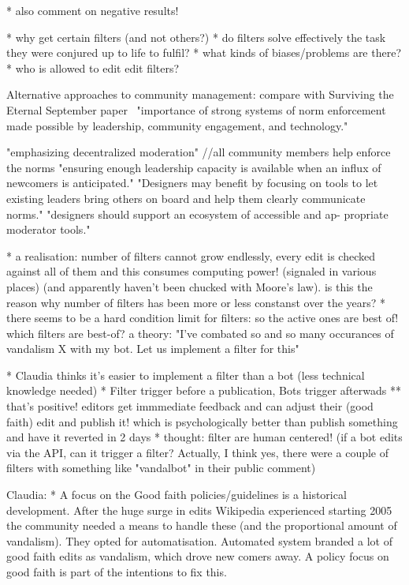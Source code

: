 * also comment on negative results!

* why get certain filters (and not others?)
* do filters solve effectively the task they were conjured up to life to fulfil?
* what kinds of biases/problems are there?
* who is allowed to edit edit filters?

Alternative approaches to community management:
compare with Surviving the Eternal September paper~\cite{KieMonHill2016}
"importance of strong
systems of norm enforcement made possible by leadership,
community engagement, and technology."

"emphasizing decentralized moderation" //all community members help enforce the norms
"ensuring enough leadership capacity is available
when an influx of newcomers is anticipated."
"Designers may
benefit by focusing on tools to let existing leaders bring others
on board and help them clearly communicate norms."
"designers should support an ecosystem of accessible and ap-
propriate moderator tools."


* a realisation: number of filters cannot grow endlessly, every edit is checked against all of them and this consumes computing power! (signaled in various places) (and apparently haven't been chucked with Moore's law). is this the reason why number of filters has been more or less constanst over the years?
* there seems to be a hard condition limit for filters: so the active ones are best of! which filters are best-of? a theory: "I've combated so and so many occurances of vandalism X with my bot. Let us implement a filter for this"

* Claudia thinks it's easier to implement a filter than a bot (less technical knowledge needed)
* Filter trigger before a publication, Bots trigger afterwads
  ** that's positive! editors get immmediate feedback and can adjust their (good faith) edit and publish it! which is psychologically better than publish something and have it reverted in 2 days
* thought: filter are human centered! (if a bot edits via the API, can it trigger a filter? Actually, I think yes, there were a couple of filters with something like "vandalbot" in their public comment)

Claudia: * A focus on the Good faith policies/guidelines is a historical development. After the huge surge in edits Wikipedia experienced starting 2005 the community needed a means to handle these (and the proportional amount of vandalism). They opted for automatisation. Automated system branded a lot of good faith edits as vandalism, which drove new comers away. A policy focus on good faith is part of the intentions to fix this.

